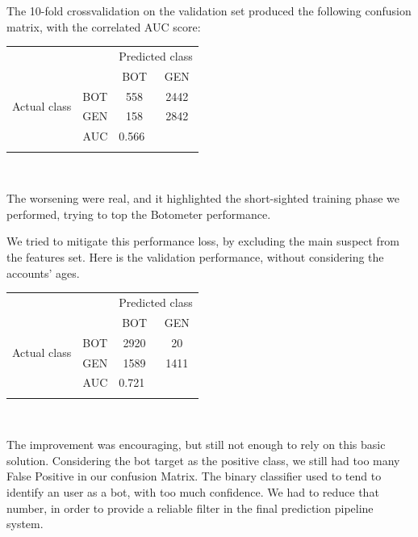 The 10-fold crossvalidation on the validation set produced the following confusion matrix, with the correlated AUC score:\\

{
	\centering
	\begin{tabular}{@{}cc|cc@{}}
		\multicolumn{1}{c}{} &\multicolumn{1}{c}{} &\multicolumn{2}{c}{Predicted class} \\ 
		\multicolumn{1}{c}{} & 
		\multicolumn{1}{c|}{} & 
		\multicolumn{1}{c}{BOT} & 
		\multicolumn{1}{c}{GEN}  \\
		\cline{2-4}
		\multirow[c]{2}{*}{Actual class}
		& BOT  & 558 & 2442\\
		& GEN  & 158 & 2842\\
		\cline{2-4}
		\multicolumn{2}{r|}{AUC} & 
		\multicolumn{2}{l}{0.566}\\
		\multicolumn{4}{c}{}\\
	\end{tabular}\\
}
The worsening were real, and it highlighted the short-sighted training phase we performed, trying to top the Botometer performance.

We tried to mitigate this performance loss, by excluding the main suspect from the features set.
Here is the validation performance, without considering the accounts' ages.

{
\centering
\begin{tabular}{@{}cc|cc@{}}
	\multicolumn{1}{c}{} &\multicolumn{1}{c}{} &\multicolumn{2}{c}{Predicted class} \\ 
	\multicolumn{1}{c}{} & 
	\multicolumn{1}{c|}{} & 
	\multicolumn{1}{c}{BOT} & 
	\multicolumn{1}{c}{GEN}  \\
	\cline{2-4}
	\multirow[c]{2}{*}{Actual class}
	& BOT  & 2920 & 20\\
	& GEN  & 1589 & 1411\\
	\cline{2-4}
	\multicolumn{2}{r|}{AUC} & 
	\multicolumn{2}{l}{0.721}\\
	\multicolumn{4}{c}{}\\
\end{tabular}\\
}

The improvement was encouraging, but still not enough to rely on this basic solution.
Considering the bot target as the positive class, we still had too many False Positive in our confusion Matrix. The binary classifier used to tend to identify an user as a bot, with too much confidence. We had to reduce that number, in order to provide a reliable filter in the final prediction pipeline system.

